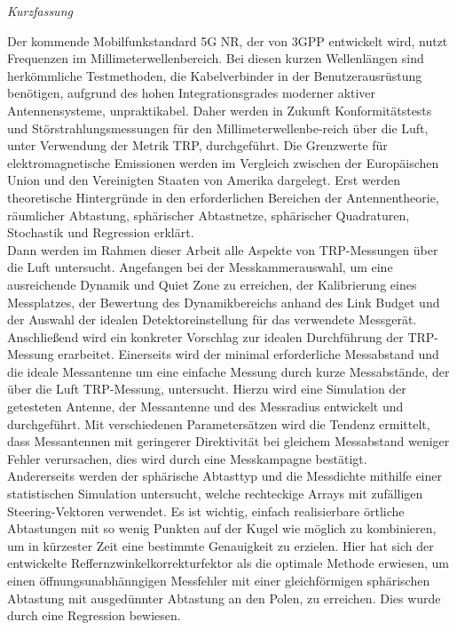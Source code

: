 

\newpage
\thispagestyle{empty}
\begin{center}
\Huge\emph{Kurzfassung}
\end{center}
\medskip
\noindent

Der kommende Mobilfunkstandard 5G NR, der von 3GPP entwickelt wird, nutzt Frequenzen im Millimeterwellenbereich.
Bei diesen kurzen Wellenlängen sind herkömmliche Testmethoden, die Kabelverbinder in der Benutzerausrüstung benötigen, aufgrund des hohen Integrationsgrades moderner aktiver Antennensysteme, unpraktikabel.
Daher werden in Zukunft Konformitätstests und Störstrahlungsmessungen für den Millimeterwellenbe-reich über die Luft, unter Verwendung der Metrik TRP, durchgeführt.
Die Grenzwerte für elektromagnetische Emissionen werden im Vergleich zwischen der Europäischen Union und den Vereinigten Staaten von Amerika dargelegt.
Erst werden theoretische Hintergründe in den erforderlichen Bereichen der Antennentheorie, räumlicher Abtastung, sphärischer Abtastnetze, sphärischer Quadraturen, Stochastik und Regression erklärt.\\

Dann werden im Rahmen dieser Arbeit alle Aspekte von TRP-Messungen über die Luft untersucht.
Angefangen bei der Messkammerauswahl, um eine ausreichende Dynamik und Quiet Zone zu erreichen, der Kalibrierung eines Messplatzes, der Bewertung des Dynamikbereichs anhand des Link Budget und der Auswahl der idealen Detektoreinstellung für das verwendete Messgerät.
Anschließend wird ein konkreter Vorschlag zur idealen Durchführung der TRP-Messung erarbeitet.
Einerseits wird der minimal erforderliche Messabstand und die ideale Messantenne um eine einfache Messung durch kurze Messabstände, der über die Luft TRP-Messung, untersucht.
Hierzu wird eine Simulation der getesteten Antenne, der Messantenne und des Messradius entwickelt und durchgeführt.
Mit verschiedenen Parametersätzen wird die Tendenz ermittelt, dass Messantennen mit geringerer Direktivität bei gleichem Messabstand weniger Fehler verursachen, dies wird durch eine Messkampagne bestätigt.\\

Andererseits werden der sphärische Abtasttyp und die Messdichte mithilfe einer statistischen Simulation untersucht, welche rechteckige Arrays mit zufälligen Steering-Vektoren verwendet.
Es ist wichtig, einfach realisierbare örtliche Abtastungen mit so wenig Punkten auf der Kugel wie möglich zu kombinieren, um in kürzester Zeit eine bestimmte Genauigkeit zu erzielen.
Hier hat sich der entwickelte Reffernzwinkelkorrekturfektor als die optimale Methode erwiesen, um einen öffnungsunabhänngigen Messfehler mit einer gleichförmigen sphärischen Abtastung mit ausgedünnter Abtastung an den Polen, zu erreichen.
Dies wurde durch eine Regression bewiesen.
